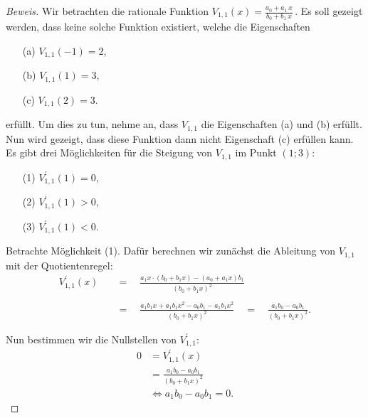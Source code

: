 \documentclass[a4paper]{article}
\begin{document}
\begin{proof}[Beweis]

    Wir betrachten die rationale Funktion $V_{1,1}(x) = \frac{a_0 + a_1\,x}{b_0 + b_1\,x}$\,. Es soll gezeigt werden,
    dass keine solche Funktion existiert, welche die Eigenschaften
    \begin{itemize}
        \item[(a)] $V_{1,1}(-1) =  2$,
        \item[(b)] $V_{1,1}(1) =  3$,
        \item[(c)] $V_{1,1}(2) =  3$.
    \end{itemize}

    erfüllt. Um dies zu tun, nehme an, dass $V_{1,1}$ die Eigenschaften (a) und (b) erfüllt. Nun wird gezeigt, dass diese Funktion dann
    nicht Eigenschaft (c) erfüllen kann. Es gibt drei Möglichkeiten für die Steigung von $V_{1,1}$ im Punkt $(1;3)$:
    \begin{itemize}
        \item[(1)] $V_{1,1}^\prime(1) = 0$,
        \item[(2)] $V_{1,1}^\prime(1) > 0$,
        \item[(3)] $V_{1,1}^\prime(1) < 0$.
    \end{itemize}

    Betrachte Möglichkeit (1). Dafür berechnen wir zunächst die Ableitung von $V_{1,1}$ mit der Quotientenregel:
    \begin{align*}
        V_{1,1}^\prime(x) \quad&=\quad \frac{a_1x\cdot (b_0 + b_1x) - (a_0 + a_1x)b_1}{(b_0 + b_1x)^2} \\\\
                          \quad&=\quad \frac{a_1b_1x + a_1b_1x^2 - a_0b_1 - a_1b_1x^2}{(b_0 + b_1x)^2} 
                          \quad=\quad \frac{a_1b_0 - a_0b_1}{(b_0 + b_1x)^2}.
    \end{align*}

    Nun bestimmen wir die Nullstellen von $V_{1,1}^\prime$:
    \begin{align*}
        0 &= V_{1,1}^\prime(x)                      \\
          &= \frac{a_1b_0 - a_0b_1}{(b_0 + b_1x)^2} \\
          &\Leftrightarrow a_1b_0 - a_0b_1 = 0.
    \end{align*}


\end{proof}
\end{document}
